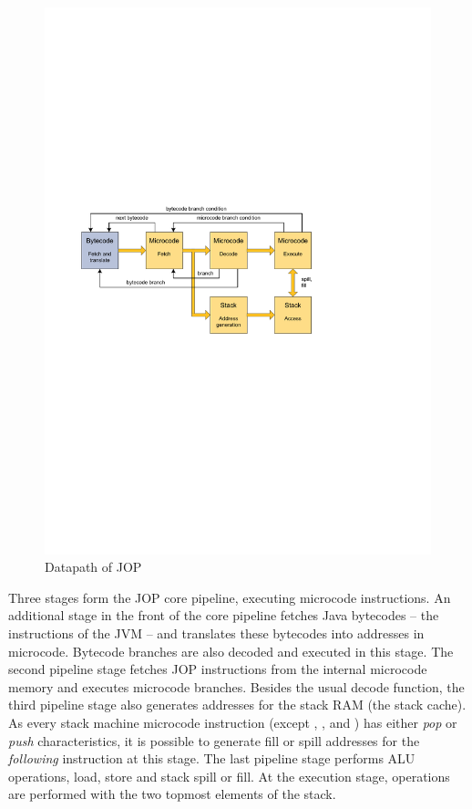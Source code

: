 \begin{figure}[t]
    \centering
    \includegraphics[scale=\picscale]{arch/arch_pipeline}
    \caption{Datapath of JOP}
    \label{fig_arch_pipeline}
\end{figure}

Three stages form the JOP core pipeline, executing microcode
instructions. An additional stage in the front of the core pipeline
fetches Java bytecodes -- the instructions of the JVM -- and
translates these bytecodes into addresses in microcode. Bytecode
branches are also decoded and executed in this stage. The second
pipeline stage fetches JOP instructions from the internal microcode
memory and executes microcode branches. Besides the usual decode
function, the third pipeline stage also generates addresses for the
stack RAM (the stack cache). As every stack machine microcode
instruction (except , , and ) has
either \emph{pop} or \emph{push} characteristics, it is possible to
generate fill or spill addresses for the \emph{following}
instruction at this stage. The last pipeline stage performs ALU
operations, load, store and stack spill or fill. At the execution
stage, operations are performed with the two topmost elements of the
stack.

